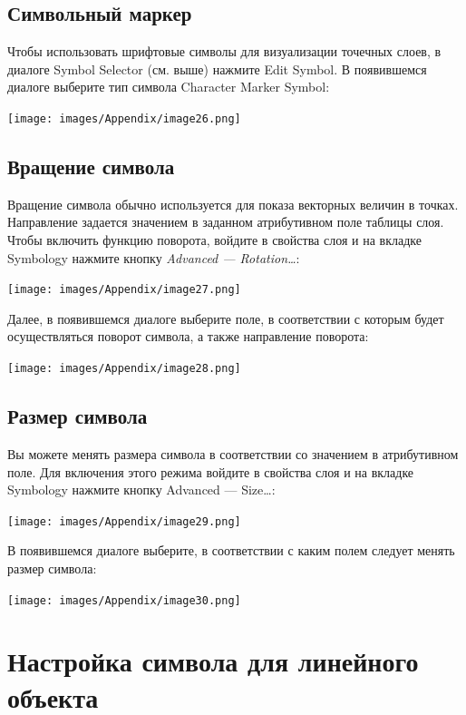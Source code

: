 \documentclass[12pt,]{book}
\begin{document}
\hypertarget{manual-vector-symbol}{%
\subsection{Символьный маркер}\label{manual-vector-symbol}}

Чтобы использовать шрифтовые символы для визуализации точечных слоев, в диалоге Symbol Selector (см. выше) нажмите Edit Symbol. В появившемся диалоге выберите тип символа Character Marker Symbol:

\texttt{[image: images/Appendix/image26.png]}

\hypertarget{manual-vector-rotation}{%
\subsection{Вращение символа}\label{manual-vector-rotation}}

Вращение символа обычно используется для показа векторных величин в точках. Направление задается значением в заданном атрибутивном поле таблицы слоя. Чтобы включить функцию поворота, войдите в свойства слоя и на вкладке Symbology нажмите кнопку \emph{Advanced --- Rotation\ldots{}}:

\texttt{[image: images/Appendix/image27.png]}

Далее, в появившемся диалоге выберите поле, в соответствии с которым будет осуществляться поворот символа, а также направление поворота:

\texttt{[image: images/Appendix/image28.png]}

\hypertarget{manual-vector-size}{%
\subsection{Размер символа}\label{manual-vector-size}}

Вы можете менять размера символа в соответствии со значением в атрибутивном поле. Для включения этого режима войдите в свойства слоя и на вкладке Symbology нажмите кнопку Advanced --- Size\ldots{}:

\texttt{[image: images/Appendix/image29.png]}

В появившемся диалоге выберите, в соответствии с каким полем следует менять размер символа:

\texttt{[image: images/Appendix/image30.png]}

\hypertarget{manual-vector-line}{%
\section{Настройка символа для линейного объекта}\label{manual-vector-line}}
\end{document}
